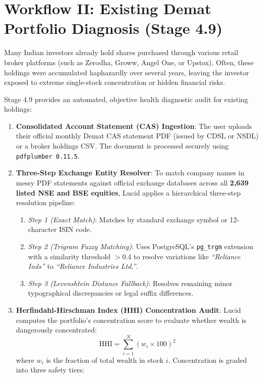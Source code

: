 \section{Workflow II: Existing Demat Portfolio Diagnosis (Stage 4.9)}
Many Indian investors already hold shares purchased through various retail broker platforms (such as Zerodha, Groww, Angel One, or Upstox). Often, these holdings were accumulated haphazardly over several years, leaving the investor exposed to extreme single-stock concentration or hidden financial risks.

Stage 4.9 provides an automated, objective health diagnostic audit for existing holdings:
\begin{enumerate}
    \item \textbf{Consolidated Account Statement (CAS) Ingestion}: The user uploads their official monthly Demat CAS statement PDF (issued by CDSL or NSDL) or a broker holdings CSV. The document is processed securely using \texttt{pdfplumber 0.11.5}.
    \item \textbf{Three-Step Exchange Entity Resolver}: To match company names in messy PDF statements against official exchange databases across all \textbf{2,639 listed NSE and BSE equities}, Lucid applies a hierarchical three-step resolution pipeline:
    \begin{enumerate}
        \item \textit{Step 1 (Exact Match)}: Matches by standard exchange symbol or 12-character ISIN code.
        \item \textit{Step 2 (Trigram Fuzzy Matching)}: Uses PostgreSQL's \texttt{pg\_trgm} extension with a similarity threshold $> 0.4$ to resolve variations like \textit{``Reliance Inds''} to \textit{``Reliance Industries Ltd.''}.
        \item \textit{Step 3 (Levenshtein Distance Fallback)}: Resolves remaining minor typographical discrepancies or legal suffix differences.
    \end{enumerate}
    \item \textbf{Herfindahl-Hirschman Index (HHI) Concentration Audit}:
    Lucid computes the portfolio's concentration score to evaluate whether wealth is dangerously concentrated:
    \begin{equation}
    \text{HHI} = \sum_{i=1}^{N} (w_i \times 100)^2
    \end{equation}
    where $w_i$ is the fraction of total wealth in stock $i$. Concentration is graded into three safety tiers:
    \begin{itemize}

\end{itemize}
\end{enumerate}
